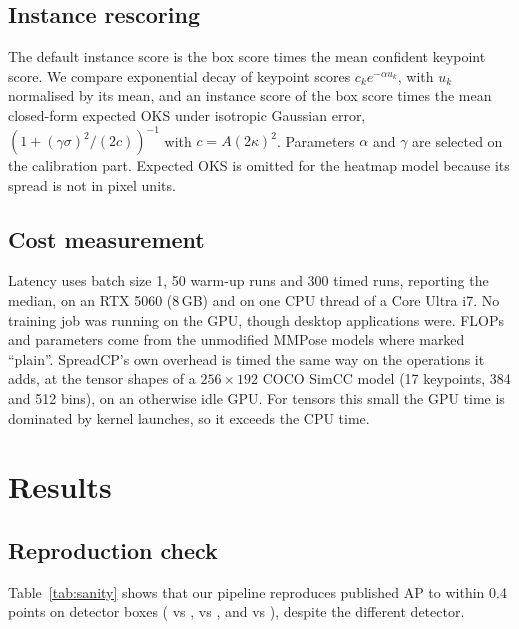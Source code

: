 \documentclass[preprint,11pt]{elsarticle}
\newcommand{\method}{SpreadCP}
\begin{document}
\subsection{Instance rescoring}\label{sec:rescoring}

The default instance score is the box score times the mean confident keypoint score. We compare
exponential decay of keypoint scores $c_k e^{-\alpha u_k}$, with $u_k$ normalised by its mean, and
an instance score of the box score times the mean closed-form expected OKS under isotropic Gaussian
error, $(1+(\gamma\sigma)^2/(2c))^{-1}$ with $c=A(2\kappa)^2$. Parameters $\alpha$ and $\gamma$ are
selected on the calibration part. Expected OKS is omitted for the heatmap model because its spread
is not in pixel units.

\subsection{Cost measurement}

Latency uses batch size 1, 50 warm-up runs and 300 timed runs, reporting the median, on an RTX 5060
(8\,GB) and on one CPU thread of a Core Ultra i7. No training job was running on the GPU, though
desktop applications were. FLOPs and parameters come from the unmodified MMPose models where
marked ``plain''. \method{}'s own overhead is timed the same way on the operations it adds, at the
tensor shapes of a $256\times192$ COCO SimCC model (17 keypoints, 384 and 512 bins), on an otherwise
idle GPU. For tensors this small the GPU time is dominated by kernel launches, so it exceeds the CPU
time.

\section{Results}

\subsection{Reproduction check}

Table~\ref{tab:sanity} shows that our pipeline reproduces published AP to within 0.4 points on
detector boxes (\ApDetZsSimccRFiveZero{} vs \ApPubZsSimccRFiveZero{},
\ApDetZsSimccMbvThree{} vs \ApPubZsSimccMbvThree{}, and \ApDetZsHmRFiveZero{} vs
\ApPubZsHmRFiveZero{}), despite the different detector.

\begin{table}[t]
\centering\small
\caption{AP on all val2017 images, with default instance scores.
$^\dagger$MMPose model zoo values, not re-measured, obtained with a different detector.}
\label{tab:sanity}
\end{table}
\end{document}
